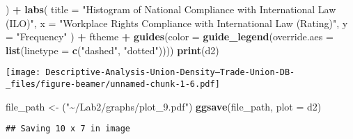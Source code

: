 \documentclass[
  ignorenonframetext,
]{beamer}
\newenvironment{Shaded}{\begin{snugshade}}{\end{snugshade}}
\newcommand{\AttributeTok}[1]{\textcolor[rgb]{0.13,0.29,0.53}{#1}}
\newcommand{\FunctionTok}[1]{\textcolor[rgb]{0.13,0.29,0.53}{\textbf{#1}}}
\newcommand{\NormalTok}[1]{#1}
\newcommand{\OtherTok}[1]{\textcolor[rgb]{0.56,0.35,0.01}{#1}}
\newcommand{\SpecialCharTok}[1]{\textcolor[rgb]{0.81,0.36,0.00}{\textbf{#1}}}
\newcommand{\StringTok}[1]{\textcolor[rgb]{0.31,0.60,0.02}{#1}}
\begin{document}
\begin{frame}[fragile]
\begin{Shaded}
\begin{Highlighting}[]
\NormalTok{  ) }\SpecialCharTok{+}
  \FunctionTok{labs}\NormalTok{(}
    \AttributeTok{title =} \StringTok{"Histogram of National Compliance with International Law (ILO)"}\NormalTok{,}
    \AttributeTok{x =} \StringTok{"Workplace Rights Compliance with International Law (Rating)"}\NormalTok{,}
    \AttributeTok{y =} \StringTok{"Frequency"}
\NormalTok{  ) }\SpecialCharTok{+}
\NormalTok{  ftheme }\SpecialCharTok{+}
  \FunctionTok{guides}\NormalTok{(}\AttributeTok{color =} \FunctionTok{guide\_legend}\NormalTok{(}\AttributeTok{override.aes =} \FunctionTok{list}\NormalTok{(}\AttributeTok{linetype =} \FunctionTok{c}\NormalTok{(}\StringTok{"dashed"}\NormalTok{, }\StringTok{"dotted"}\NormalTok{))))}
\FunctionTok{print}\NormalTok{(d2)}
\end{Highlighting}
\end{Shaded}

\texttt{[image: Descriptive-Analysis-Union-Density--Trade-Union-DB-\_files/figure-beamer/unnamed-chunk-1-6.pdf]}

\begin{Shaded}
\begin{Highlighting}[]
\NormalTok{file\_path }\OtherTok{\textless{}{-}}\NormalTok{ (}\StringTok{"\textasciitilde{}/Lab2/graphs/plot\_9.pdf"}\NormalTok{)}
\FunctionTok{ggsave}\NormalTok{(file\_path, }\AttributeTok{plot =}\NormalTok{ d2)}
\end{Highlighting}
\end{Shaded}

\begin{verbatim}
## Saving 10 x 7 in image
\end{verbatim}
\end{frame}
\end{document}
